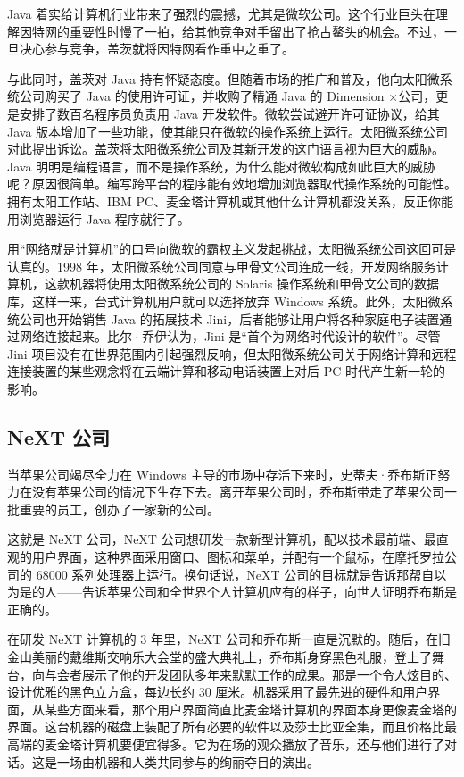 \documentclass[12pt,UTF8]{ctexbook}
\begin{document}
Java 着实给计算机行业带来了强烈的震撼，尤其是微软公司。这个行业巨头在理解因特网的重要性时慢了一拍，给其他竞争对手留出了抢占鳌头的机会。不过，一旦决心参与竞争，盖茨就将因特网看作重中之重了。

与此同时，盖茨对 Java 持有怀疑态度。但随着市场的推广和普及，他向太阳微系统公司购买了 Java 的使用许可证，并收购了精通 Java 的 Dimension ×公司，更是安排了数百名程序员负责用 Java 开发软件。微软尝试避开许可证协议，给其 Java 版本增加了一些功能，使其能只在微软的操作系统上运行。太阳微系统公司对此提出诉讼。盖茨将太阳微系统公司及其新开发的这门语言视为巨大的威胁。Java 明明是编程语言，而不是操作系统，为什么能对微软构成如此巨大的威胁呢？原因很简单。编写跨平台的程序能有效地增加浏览器取代操作系统的可能性。拥有太阳工作站、IBM PC、麦金塔计算机或其他什么计算机都没关系，反正你能用浏览器运行 Java 程序就行了。

用“网络就是计算机”的口号向微软的霸权主义发起挑战，太阳微系统公司这回可是认真的。1998 年，太阳微系统公司同意与甲骨文公司连成一线，开发网络服务计算机，这款机器将使用太阳微系统公司的 Solaris 操作系统和甲骨文公司的数据库，这样一来，台式计算机用户就可以选择放弃 Windows 系统。此外，太阳微系统公司也开始销售 Java 的拓展技术 Jini，后者能够让用户将各种家庭电子装置通过网络连接起来。比尔·乔伊认为，Jini 是“首个为网络时代设计的软件”。尽管 Jini 项目没有在世界范围内引起强烈反响，但太阳微系统公司关于网络计算和远程连接装置的某些观念将在云端计算和移动电话装置上对后 PC 时代产生新一轮的影响。





\subsection{NeXT 公司}


当苹果公司竭尽全力在 Windows 主导的市场中存活下来时，史蒂夫·乔布斯正努力在没有苹果公司的情况下生存下去。离开苹果公司时，乔布斯带走了苹果公司一批重要的员工，创办了一家新的公司。

这就是 NeXT 公司，NeXT 公司想研发一款新型计算机，配以技术最前端、最直观的用户界面，这种界面采用窗口、图标和菜单，并配有一个鼠标，在摩托罗拉公司的 68000 系列处理器上运行。换句话说，NeXT 公司的目标就是告诉那帮自以为是的人——告诉苹果公司和全世界个人计算机应有的样子，向世人证明乔布斯是正确的。

在研发 NeXT 计算机的 3 年里，NeXT 公司和乔布斯一直是沉默的。随后，在旧金山美丽的戴维斯交响乐大会堂的盛大典礼上，乔布斯身穿黑色礼服，登上了舞台，向与会者展示了他的开发团队多年来默默工作的成果。那是一个令人炫目的、设计优雅的黑色立方盒，每边长约 30 厘米。机器采用了最先进的硬件和用户界面，从某些方面来看，那个用户界面简直比麦金塔计算机的界面本身更像麦金塔的界面。这台机器的磁盘上装配了所有必要的软件以及莎士比亚全集，而且价格比最高端的麦金塔计算机要便宜得多。它为在场的观众播放了音乐，还与他们进行了对话。这是一场由机器和人类共同参与的绚丽夺目的演出。
\end{document}
